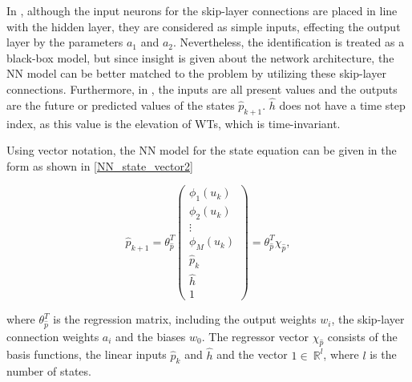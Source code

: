  \vspace{-3mm}

 In , although the input neurons for the skip-layer connections are placed in line with the hidden layer, they are considered as simple inputs, effecting the output layer by the parameters $a_1$ and $a_2$. Nevertheless, the identification is treated as a black-box model, but since insight is given about the network architecture, the NN model can be better matched to the problem by utilizing these skip-layer connections. Furthermore, in , the inputs are all present values and the outputs are the future or predicted values of the states $\hat{p}_{k+1}$. $\hat{h}$ does not have a time step index, as this value is the elevation of WTs, which is time-invariant. 

 Using vector notation, the NN model for the state equation can be given in the form as shown in \eqref{NN_state_vector2}

  \begin{equation}
\label{NN_state_vector2}
\hat{p}_{k+1} = \theta^T_{\hat{p}} 
          \begin{pmatrix}
           \phi_1(u_k) \\[1pt]
           \phi_2(u_k) \\[1pt]
           \vdots \\[1pt]
           \phi_M(u_k)\\[3pt]
           \hat{p}_k \\
           \hat{h}\\
           1 
         \end{pmatrix}
         =
         \theta^T_{\hat{p}} \chi_{\hat{p}},
\end{equation}

where $\theta^T_{\hat{p}}$ is the regression matrix, including the output weights $w_i$, the skip-layer connection weights $a_i$ and the biases $w_0$. The regressor vector $\chi_{\hat{p}}$ consists of the basis functions, the linear inputs $\hat{p}_k$ and $\hat{h}$ and the vector $1 \in \: \mathbb{R}^{l} $, where $l$ is the number of states.





